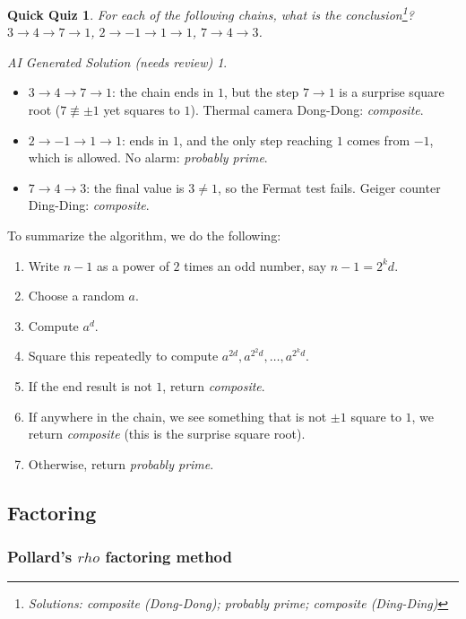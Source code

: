 \documentclass{article}
\theoremstyle{plain}
\newtheorem{quiz}[theorem]{Quick Quiz}
\theoremstyle{definition}
\theoremstyle{remark}
\newtheorem*{aisolution}{AI Generated Solution (needs review)}
\numberwithin{theorem}{section}
\begin{document}
\begin{quiz}
    For each of the following chains, what is the conclusion\footnote{Solutions: composite (Dong-Dong); probably prime; composite (Ding-Ding)}?  $3 \rightarrow 4 \rightarrow 7 \rightarrow 1$, $2 \rightarrow -1 \rightarrow 1 \rightarrow 1$, $7 \rightarrow 4 \rightarrow 3$.
\end{quiz}
\begin{aisolution}
\begin{itemize}
\item $3 \rightarrow 4 \rightarrow 7 \rightarrow 1$: the chain ends in $1$, but the step $7 \rightarrow 1$ is a surprise square root ($7 \not\equiv \pm 1$ yet squares to $1$).  Thermal camera Dong-Dong: \emph{composite}.
\item $2 \rightarrow -1 \rightarrow 1 \rightarrow 1$: ends in $1$, and the only step reaching $1$ comes from $-1$, which is allowed.  No alarm: \emph{probably prime}.
\item $7 \rightarrow 4 \rightarrow 3$: the final value is $3 \neq 1$, so the Fermat test fails.  Geiger counter Ding-Ding: \emph{composite}.
\end{itemize}
\end{aisolution}


To summarize the algorithm, we do the following:
\begin{enumerate}
    \item Write $n-1$ as a power of $2$ times an odd number, say $n-1 = 2^k d$.
    \item Choose a random $a$.
    \item Compute $a^d$.
    \item Square this repeatedly to compute $a^{2d}, a^{2^2d}, \ldots, a^{2^kd}$.
    \item If the end result is not $1$, return \emph{composite}.
    \item If anywhere in the chain, we see something that is not $\pm 1$ square to $1$, we return \emph{composite} (this is the surprise square root).
    \item Otherwise, return \emph{probably prime}.
\end{enumerate}


\subsection{Factoring}

\subsubsection{Pollard's $rho$ factoring method}
\end{document}
